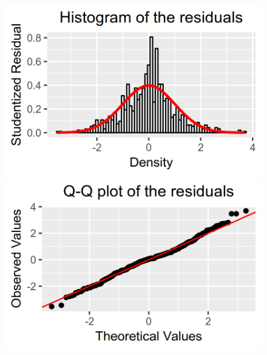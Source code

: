 \documentclass[a4paper, 12pt, oneside, openany, final, pdftex]{book}\usepackage[]{graphicx}\usepackage[]{color}
\makeatletter
\def\maxwidth{ %
  \ifdim\Gin@nat@width>\linewidth
    \linewidth
  \else
    \Gin@nat@width
  \fi
}
\newenvironment{knitrout}{}{} %
\makeatother
\begin{document}
\begin{figure}
	\centering
\begin{knitrout}
\color{fgcolor}
\includegraphics[width=\maxwidth]{figure/Figure-Histogram-D1-1} 

\end{knitrout}
    \endminipage\hfill 
\begin{knitrout}
\color{fgcolor}
\includegraphics[width=\maxwidth]{figure/Figure-Q-Q-D1-1} 


\end{knitrout}
\end{figure}
\end{document}

